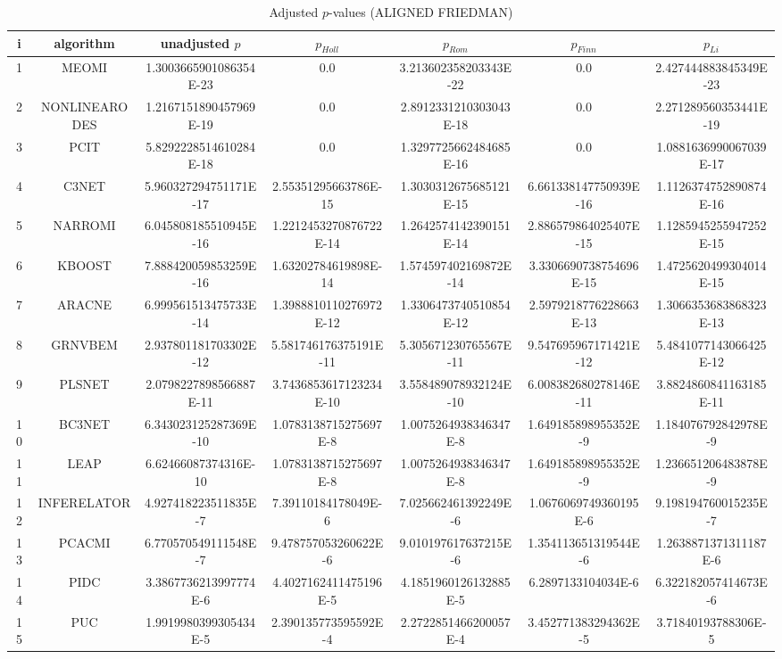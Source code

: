 \documentclass[a4paper,10pt]{article}
\begin{document}
\begin{landscape}
\begin{table}[!htp]
\centering\scriptsize
\caption{Adjusted $p$-values (ALIGNED FRIEDMAN)}
\begin{tabular}{ccccccc}
i&algorithm&unadjusted $p$&$p_{Holl}$&$p_{Rom}$&$p_{Finn}$&$p_{Li}$\\
\hline
1&MEOMI&1.3003665901086354E-23&0.0&3.213602358203343E-22&0.0&2.427444883845349E-23\\
2&NONLINEARODES&1.2167151890457969E-19&0.0&2.8912331210303043E-18&0.0&2.271289560353441E-19\\
3&PCIT&5.8292228514610284E-18&0.0&1.3297725662484685E-16&0.0&1.0881636990067039E-17\\
4&C3NET&5.960327294751171E-17&2.55351295663786E-15&1.3030312675685121E-15&6.661338147750939E-16&1.1126374752890874E-16\\
5&NARROMI&6.045808185510945E-16&1.2212453270876722E-14&1.2642574142390151E-14&2.886579864025407E-15&1.1285945255947252E-15\\
6&KBOOST&7.888420059853259E-16&1.63202784619898E-14&1.574597402169872E-14&3.3306690738754696E-15&1.4725620499304014E-15\\
7&ARACNE&6.999561513475733E-14&1.3988810110276972E-12&1.3306473740510854E-12&2.5979218776228663E-13&1.3066353683868323E-13\\
8&GRNVBEM&2.937801181703302E-12&5.581746176375191E-11&5.305671230765567E-11&9.547695967171421E-12&5.4841077143066425E-12\\
9&PLSNET&2.0798227898566887E-11&3.7436853617123234E-10&3.558489078932124E-10&6.008382680278146E-11&3.8824860841163185E-11\\
10&BC3NET&6.343023125287369E-10&1.0783138715275697E-8&1.0075264938346347E-8&1.649185898955352E-9&1.184076792842978E-9\\
11&LEAP&6.62466087374316E-10&1.0783138715275697E-8&1.0075264938346347E-8&1.649185898955352E-9&1.236651206483878E-9\\
12&INFERELATOR&4.927418223511835E-7&7.39110184178049E-6&7.025662461392249E-6&1.0676069749360195E-6&9.198194760015235E-7\\
13&PCACMI&6.770570549111548E-7&9.478757053260622E-6&9.010197617637215E-6&1.354113651319544E-6&1.2638871371311187E-6\\
14&PIDC&3.3867736213997774E-6&4.4027162411475196E-5&4.1851960126132885E-5&6.2897133104034E-6&6.322182057414673E-6\\
15&PUC&1.9919980399305434E-5&2.390135773595592E-4&2.2722851466200057E-4&3.452771383294362E-5&3.71840193788306E-5\\

\end{tabular}
\end{table}
\end{landscape}
\end{document}
